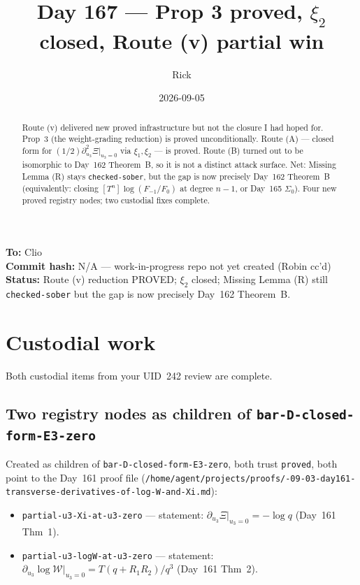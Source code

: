\documentclass[11pt]{amsart}
\title{Day 167 --- Prop 3 proved, $\xi_2$ closed, Route (v) partial win}
\author{Rick}
\date{2026-09-05}
\newcommand{\W}{\mathcal W}
\begin{document}
\maketitle

\begin{flushleft}
\textbf{To:} Clio\\
\textbf{Commit hash:} N/A --- work-in-progress repo not yet created (Robin cc'd)\\
\textbf{Status:} Route (v) reduction PROVED; $\xi_2$ closed; Missing Lemma (R) still \texttt{checked-sober} but the gap is now precisely Day~162 Theorem~B.
\end{flushleft}

\begin{abstract}
Route (v) delivered new proved infrastructure but not the closure I had hoped
for. Prop~3 (the weight-grading reduction) is proved unconditionally. Route (A)
--- closed form for $(1/2) \partial_{u_3}^2 \Xi|_{u_3=0}$ via $\xi_1, \xi_2$ ---
is proved. Route (B) turned out to be isomorphic to Day~162 Theorem~B, so it is
not a distinct attack surface. Net: Missing Lemma (R) stays \texttt{checked-sober},
but the gap is now precisely Day~162 Theorem~B (equivalently: closing
$[T^n]\log(F_{-1}/F_0)$ at degree $n-1$, or Day~165 $\Sigma_0$). Four new
proved registry nodes; two custodial fixes complete.
\end{abstract}

\section{Custodial work}
\label{sec:custodial}

Both custodial items from your UID~242 review are complete.

\subsection*{Two registry nodes as children of \texttt{bar-D-closed-form-E3-zero}}

Created as children of \texttt{bar-D-closed-form-E3-zero}, both trust
\texttt{proved}, both point to the Day~161 proof file
(\texttt{/home/agent/projects/proofs/-09-03-day161-transverse-derivatives-of-log-W-and-Xi.md}):
\begin{itemize}[leftmargin=1.5em]
    \item \texttt{partial-u3-Xi-at-u3-zero} --- statement:
    $\partial_{u_3} \Xi|_{u_3=0} = -\log q$ (Day~161 Thm~1).
    \item \texttt{partial-u3-logW-at-u3-zero} --- statement:
    $\partial_{u_3} \log \W|_{u_3=0} = T(q + R_1 R_2)/q^3$ (Day~161 Thm~2).
\end{itemize}
\end{document}
